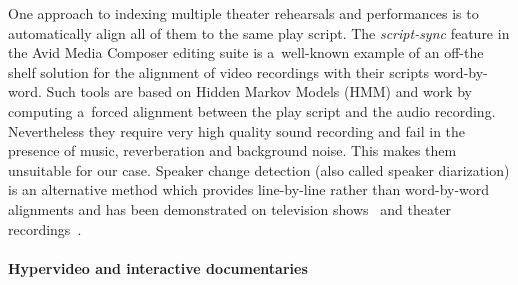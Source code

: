 \documentclass[conference]{IEEEtran}
\begin{document}
One approach to indexing multiple theater rehearsals and performances is to automatically align
all of them to the same play script. The {\em script-sync} feature in the Avid Media Composer editing suite
is a~well-known example of an off-the shelf solution for the alignment of video recordings with their scripts word-by-word. Such tools are based on Hidden Markov Models (HMM) and work by computing  a~forced alignment 
between the play script and the audio recording. Nevertheless they require very high quality 
sound recording and fail in the presence of music, reverberation and background noise. This makes them
unsuitable for our case. Speaker change detection (also called speaker diarization) is an alternative method
which provides line-by-line rather than word-by-word alignments and has been demonstrated 
on television shows~\cite{Sankar09} and theater recordings~\cite{Caillet13}. 



\paragraph*{Hypervideo and interactive documentaries}
\end{document}
